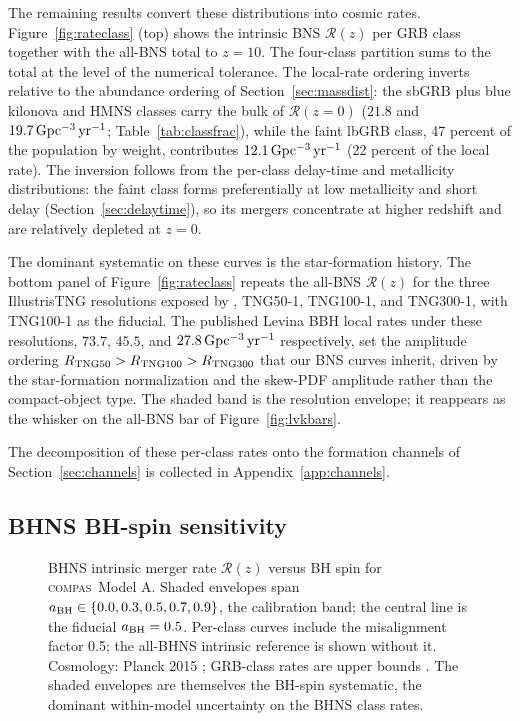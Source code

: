 \documentclass[twocolumn,amsmath]{aastex702}
\newcommand{\compas}{\textsc{compas}}
\newcommand{\Rz}{\mathcal{R}(z)}
\newcommand{\Rzero}{\mathcal{R}(z{=}0)}
\newcommand{\aBH}{a_{\rm BH}}
\newcommand{\Gpcyr}{{\rm Gpc^{-3}\,yr^{-1}}}
\begin{document}
The remaining results convert these distributions into cosmic rates.
Figure~\ref{fig:rateclass} (top) shows the intrinsic BNS $\Rz$ per GRB class
together with the all-BNS total to $z = 10$. The four-class partition sums to
the total at the level of the numerical tolerance. The local-rate ordering
inverts relative to the abundance ordering of Section~\ref{sec:massdist}: the
sbGRB plus blue kilonova and HMNS classes carry the bulk of $\Rzero$ ($21.8$
and $19.7\,\Gpcyr$; Table~\ref{tab:classfrac}), while the faint lbGRB class, 47
percent of the population by weight, contributes $12.1\,\Gpcyr$ (22 percent of
the local rate). The inversion follows from the per-class delay-time and
metallicity distributions: the faint class forms preferentially at low
metallicity and short delay (Section~\ref{sec:delaytime}), so its mergers
concentrate at higher redshift and are relatively depleted at $z = 0$.

The dominant systematic on these curves is the star-formation history. The
bottom panel of Figure~\ref{fig:rateclass} repeats the all-BNS $\Rz$ for the
three IllustrisTNG resolutions exposed by \citet{levina2026}, TNG50-1,
TNG100-1, and TNG300-1, with TNG100-1 as the fiducial. The published Levina BBH
local rates under these resolutions, $73.7$, $45.5$, and $27.8\,\Gpcyr$
respectively, set the amplitude ordering
$R_{\rm TNG50} > R_{\rm TNG100} > R_{\rm TNG300}$ that our BNS curves inherit,
driven by the star-formation normalization and the skew-PDF amplitude rather
than the compact-object type. The shaded band is the resolution envelope; it
reappears as the whisker on the all-BNS bar of Figure~\ref{fig:lvkbars}.

The decomposition of these per-class rates onto the \citet{broekgaarden2021}
formation channels of Section~\ref{sec:channels} is collected in
Appendix~\ref{app:channels}.

\subsection{BHNS BH-spin sensitivity} \label{sec:spin}

\begin{figure}[tbp]
\caption{BHNS intrinsic merger rate $\Rz$ versus BH spin for \compas\ Model A.
Shaded envelopes span $\aBH \in \{0.0, 0.3, 0.5, 0.7, 0.9\}$, the
\citet{foucart2018} calibration band; the central line is the fiducial
$\aBH = 0.5$. Per-class curves include the misalignment factor 0.5; the
all-BHNS intrinsic reference is shown without it. Cosmology: Planck 2015
\citep{planck2016}; GRB-class rates are upper bounds \citep{gottlieb2023}. The
shaded envelopes are themselves the BH-spin systematic, the dominant
within-model uncertainty on the BHNS class rates. \label{fig:spinsweep}}
\end{figure}
\end{document}
